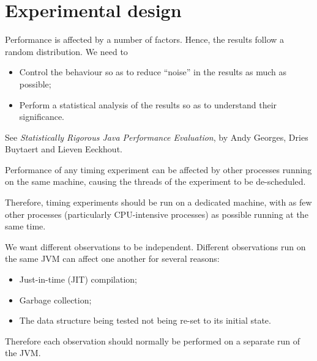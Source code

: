 \chapter{Experimental design}


\begin{slide}

Performance is affected by a number of factors.  Hence, the results follow a
random distribution.  We need to
%
\begin{itemize}
\item
Control the behaviour so as to reduce ``noise'' in the results as much as
possible;

\item
Perform a statistical analysis of the results so as to understand their
significance.
\end{itemize}

See \emph{Statistically Rigorous Java Performance Evaluation}, by Andy
Georges, Dries Buytaert and Lieven Eeckhout.
\end{slide}


\begin{slide}

Performance of any timing experiment can be affected by other processes
running on the same machine, causing the threads of the experiment to be
de-scheduled. 

Therefore, timing experiments should be run on a dedicated machine, with as
few other processes (particularly CPU-intensive processes) as possible running
at the same time.

\end{slide}


\begin{slide}

We want different observations to be independent.  Different observations run
on the same JVM can affect one another for several reasons:
%
\begin{itemize}
\item
Just-in-time (JIT) compilation;

\item
Garbage collection;


\item
The data structure being tested not being re-set to its initial state.
\end{itemize}
%
Therefore each observation should normally be performed on a separate run of
the JVM.
\end{slide}


